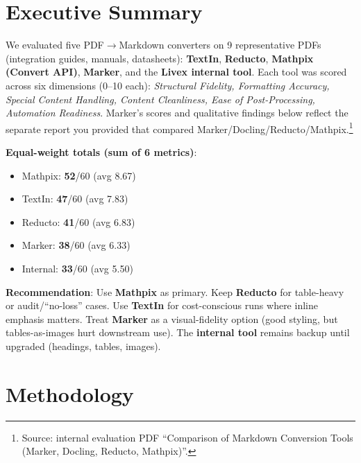 \documentclass[11pt,a4paper]{article}
\begin{document}
\section*{Executive Summary}

We evaluated five PDF$\to$Markdown converters on 9 representative PDFs (integration guides, manuals, datasheets):
\textbf{TextIn}, \textbf{Reducto}, \textbf{Mathpix (Convert API)}, \textbf{Marker}, and the \textbf{Livex internal tool}.
Each tool was scored across six dimensions (0--10 each): \emph{Structural Fidelity, Formatting Accuracy, Special Content Handling, Content Cleanliness, Ease of Post-Processing, Automation Readiness}.
Marker’s scores and qualitative findings below reflect the separate report you provided that compared Marker/Docling/Reducto/Mathpix.\footnote{Source: internal evaluation PDF “Comparison of Markdown Conversion Tools (Marker, Docling, Reducto, Mathpix)”.}

\smallskip
\noindent\textbf{Equal-weight totals (sum of 6 metrics)}:
\begin{itemize}[leftmargin=1.2em]
  \item Mathpix: \textbf{52}/60 (avg 8.67)
  \item TextIn: \textbf{47}/60 (avg 7.83)
  \item Reducto: \textbf{41}/60 (avg 6.83)
  \item Marker: \textbf{38}/60 (avg 6.33)
  \item Internal: \textbf{33}/60 (avg 5.50)
\end{itemize}

\noindent\textbf{Recommendation}: Use \textbf{Mathpix} as primary. Keep \textbf{Reducto} for table-heavy or audit/“no-loss” cases. Use \textbf{TextIn} for cost-conscious runs where inline emphasis matters. Treat \textbf{Marker} as a visual-fidelity option (good styling, but tables-as-images hurt downstream use). The \textbf{internal tool} remains backup until upgraded (headings, tables, images).

\section*{Methodology}
\end{document}
